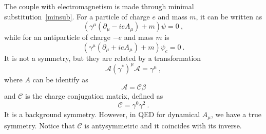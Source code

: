     The couple with electromagnetism is made through minimal substitution~\eqref{minsub}. For a particle of charge $e$ and mass $m$, it can be written as 
    \begin{equation*}
        (\gamma^\mu (\partial_\mu - i e A_\mu) + m) \psi = 0 ~,
    \end{equation*}
    while for an antiparticle of charge $-e$ and mass $m$ is 
    \begin{equation*}
        (\gamma^\mu (\partial_\mu + i e A_\mu) + m) \psi_c = 0 ~.
    \end{equation*}
    It is not a symmetry, but they are related by a transformation
    \begin{equation*}
        \mathcal A (\gamma^*)^\mu \mathcal A = \gamma^\mu ~,
    \end{equation*}
    where $A$ can be identify as 
    \begin{equation*}
        \mathcal A = \mathcal C \beta
    \end{equation*}
    and $\mathcal C$ is the charge conjugation matrix, defined as 
    \begin{equation*}
        \mathcal C = \gamma^0 \gamma^2 ~.
    \end{equation*}
    It is a background symmetry. However, in QED for dynamical $A_\mu$, we have a true symmetry. Notice that $\mathcal C$ is antysymmetric and it coincides with its inverse.
